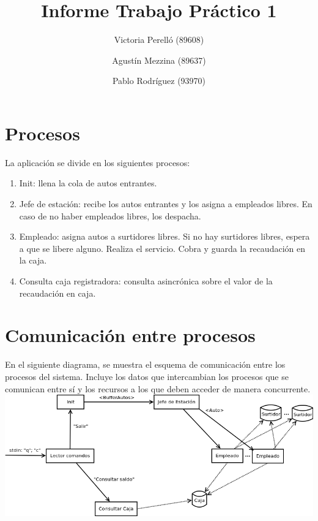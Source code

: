 \documentclass{article}
\begin{document}
\title{Informe Trabajo Práctico 1}
\author{Victoria Perelló (89608)\\
        \and
        Agustín Mezzina (89637)\\
	\and
        Pablo Rodríguez (93970)}
\maketitle

\section{Procesos}
La aplicación se divide en los siguientes procesos:
\begin{enumerate}
	\item Init: llena la cola de autos entrantes.
	\item Jefe de estación: recibe los autos entrantes y los asigna a empleados libres. En caso de no haber empleados libres, los despacha.
	\item Empleado: asigna autos a surtidores libres. Si no hay surtidores libres, espera a que se libere alguno. Realiza el servicio. Cobra y guarda la recaudación en la caja.
	\item Consulta caja registradora: consulta asincrónica sobre el valor de la recaudación en caja.
\end{enumerate}

\section{Comunicación entre procesos}
En el siguiente diagrama, se muestra el esquema de comunicación entre los procesos del sistema. Incluye los datos que intercambian los procesos que se comunican entre sí y los recursos a los que deben acceder de manera concurrente.
\\[1\baselineskip]
\includegraphics[width=\textwidth]{overview}
\end{document}
